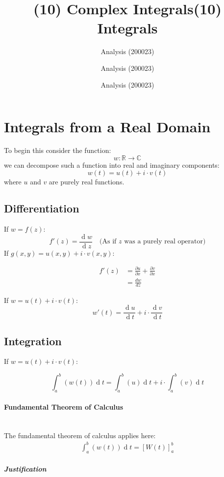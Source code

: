 \documentclass[class=article, crop=false]{standalone}
\title{(10) Complex Integrals}
\date{Analysis (200023)}
\author{Analysis (200023)}
\title{(10) Integrals}
\author{Analysis (200023)}
\begin{document}
	\maketitle
	\tableofcontents
	
        \section{Integrals from a Real Domain}
        To begin this consider the function:
        \[
        w: \mathbb{R}     \rightarrow \mathbb{C}  
        \]
        we can decompose such a function into real and imaginary components:
        \[
          w \left( t \right) =  u \left( t \right) +  i \cdot  v \left( t \right) 
        \]
        where $u$ and $v$ are purely real functions.
        \subsection{Differentiation}
        If $w =  f \left( z \right) $:
        \[
          f' \left( z \right) = \frac{\operatorname{d}w }{\operatorname{d} z} \quad \text{(As if $z$ was a purely real operator)}
        \]
        If $g\left( x,y \right)  =  u\left(  x,y  \right)  +  i \cdot  v \left( x, y \right) $: 

        \begin{align*}
        f'\left( z \right) &= \frac{\partial u }{\partial x}+ \frac{\partial v }{\partial x} \\
        &= \frac{dw}{dz}
        \end{align*}

        If $w =  u\left( t \right) + i \cdot v \left( t \right) $:
        \[
        w'\left( t \right) =  \frac{\operatorname{d}u }{\operatorname{d} t} + i \cdot \frac{\operatorname{d} v}{\operatorname{d} t}
        \]

        \subsection{Integration}
        If $w =  u\left( t \right) + i \cdot v \left( t \right) $:


        \[
        \int^{b}_{a}\left( w \left( t \right)  \right) \operatorname{d}t =  \int^{b}_{a}\left( u \right) \operatorname{d}t + i \cdot  \int^{ b}_{a}\left( v \right) \operatorname{d}t   
        \]

        \paragraph{Fundamental Theorem of Calculus} \ \\
        The fundamental theorem of calculus applies here:
        \begin{align}
         \int^{b}_{a}\left( w\left( t \right)  \right) \operatorname{d}t =  \left[ W\left( t \right)  \right]^b_a 
          \label{ftcest}
        \end{align}
        \subparagraph{Justification}
\end{document}
